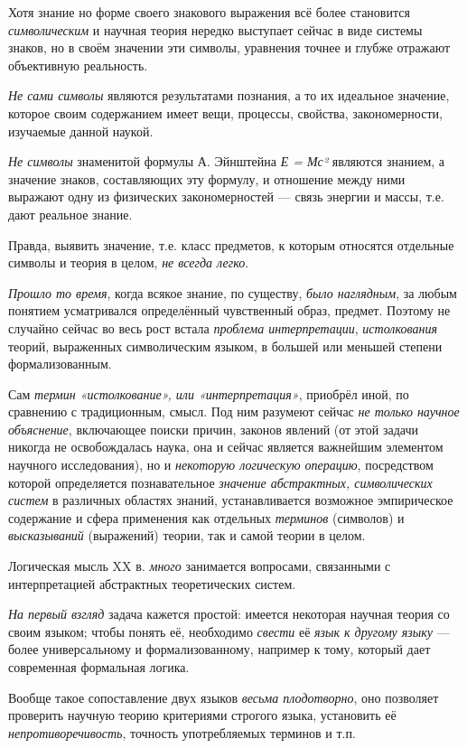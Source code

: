 \documentclass[a4paper,14pt,russian]{extreport}
\begin{document}
Хотя знание но форме своего знакового выражения всё более становится \emph{символическим} и научная теория нередко выступает сейчас в виде системы знаков, но в своём значении эти символы, уравнения точнее и глубже отражают объективную реальность.

\emph{Не сами символы} являются результатами познания, а то их идеальное значение, которое своим содержанием имеет вещи, процессы, свойства, закономерности, изучаемые данной наукой.

\emph{Не символы} знаменитой формулы А. Эйнштейна \emph{Е = Мс²} являются знанием, а значение знаков, составляющих эту формулу, и отношение между ними выражают одну из физических закономерностей --- связь энергии и массы, т.е. дают реальное знание.

Правда, выявить значение, т.е. класс предметов, к которым относятся отдельные символы и теория в целом, \emph{не всегда легко}.

\emph{Прошло то время}, когда всякое знание, по существу, \emph{было наглядным}, за любым понятием усматривался определённый чувственный образ, предмет. Поэтому не случайно сейчас во весь рост встала \emph{проблема интерпретации}, \emph{истолкования} теорий, выраженных символическим языком, в большей или меньшей степени формализованным.

Сам \emph{термин «истолкование», или «интерпретация»}, приобрёл иной, по сравнению с традиционным, смысл. Под ним разумеют сейчас \emph{не только научное объяснение}, включающее поиски причин, законов явлений (от этой задачи никогда не освобождалась наука, она и сейчас является важнейшим элементом научного исследования), но и \emph{некоторую логическую операцию}, посредством которой определяется познавательное \emph{значение абстрактных, символических систем} в различных областях знаний, устанавливается возможное эмпирическое содержание и сфера применения как отдельных \emph{терминов} (символов) и \emph{высказываний} (выражений) теории, так и самой теории в целом.

Логическая мысль XX в. \emph{много} занимается вопросами, связанными с интерпретацией абстрактных теоретических систем.

\emph{На первый взгляд} задача кажется простой: имеется некоторая научная теория со своим языком; чтобы понять её, необходимо \emph{свести} её \emph{язык к другому языку} --- более универсальному и формализованному, например к тому, который дает современная формальная логика.

Вообще такое сопоставление двух языков \emph{весьма плодотворно}, оно позволяет проверить научную теорию критериями строгого языка, установить её \emph{непротиворечивость}, точность употребляемых терминов и т.п.
\end{document}

